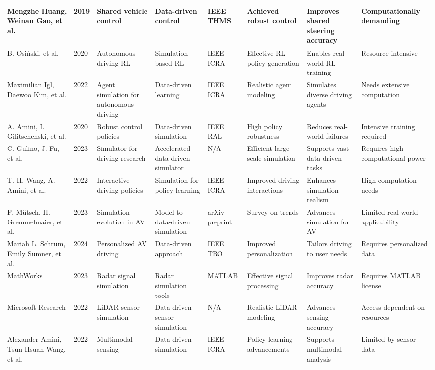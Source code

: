 \documentclass[lettersize,journal]{IEEEtran}
\begin{document}
\begin{longtable}{|p{2cm}|p{1cm}|p{2cm}|p{2cm}|p{2cm}|p{2cm}|p{2cm}|p{2.5cm}|}
\hline
Mengzhe Huang, Weinan Gao, et al. & 2019 & Shared vehicle control & Data-driven control & IEEE THMS & Achieved robust control & Improves shared steering accuracy & Computationally demanding \\
\hline
B. Osiński, et al. & 2020 & Autonomous driving RL & Simulation-based RL & IEEE ICRA & Effective RL policy generation & Enables real-world RL training & Resource-intensive \\
\hline
Maximilian Igl, Daewoo Kim, et al. & 2022 & Agent simulation for autonomous driving & Data-driven learning & IEEE ICRA & Realistic agent modeling & Simulates diverse driving agents & Needs extensive computation \\
\hline
A. Amini, I. Gilitschenski, et al. & 2020 & Robust control policies & Data-driven simulation & IEEE RAL & High policy robustness & Reduces real-world failures & Intensive training required \\
\hline
C. Gulino, J. Fu, et al. & 2023 & Simulator for driving research & Accelerated data-driven simulator & N/A & Efficient large-scale simulation & Supports vast data-driven tasks & Requires high computational power \\
\hline
T.-H. Wang, A. Amini, et al. & 2022 & Interactive driving policies & Simulation for policy learning & IEEE ICRA & Improved driving interactions & Enhances simulation realism & High computation needs \\
\hline
F. Mütsch, H. Gremmelmaier, et al. & 2023 & Simulation evolution in AV & Model-to-data-driven simulation & arXiv preprint & Survey on trends & Advances simulation for AV & Limited real-world applicability \\
\hline
Mariah L. Schrum, Emily Sumner, et al. & 2024 & Personalized AV driving & Data-driven approach & IEEE TRO & Improved personalization & Tailors driving to user needs & Requires personalized data \\
\hline
MathWorks & 2023 & Radar signal simulation & Radar simulation tools & MATLAB & Effective signal processing & Improves radar accuracy & Requires MATLAB license \\
\hline
Microsoft Research & 2022 & LiDAR sensor simulation & Data-driven sensor simulation & N/A & Realistic LiDAR modeling & Advances sensing accuracy & Access dependent on resources \\
\hline
Alexander Amini, Tsun-Hsuan Wang, et al. & 2022 & Multimodal sensing & Data-driven simulation & IEEE ICRA & Policy learning advancements & Supports multimodal analysis & Limited by sensor data \\

\end{longtable}
\end{document}
